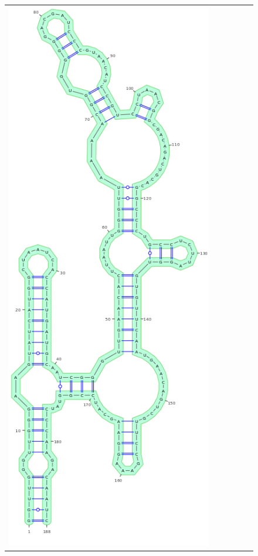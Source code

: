 \documentclass[11pt]{article} %
\begin{document}
\begin{figure}
\newcommand{\MyScale}{.26}

{\centering
	\begin{adjustbox}{max width=\textwidth,max height=\textheight,keepaspectratio}
\begin{tabular}{@{}c|ccccc@{}}

 \includegraphics[scale=\MyScale]{graphs/Supp_structures/native_structure}&

\end{tabular}
\end{adjustbox}}
\end{figure}
\end{document}
